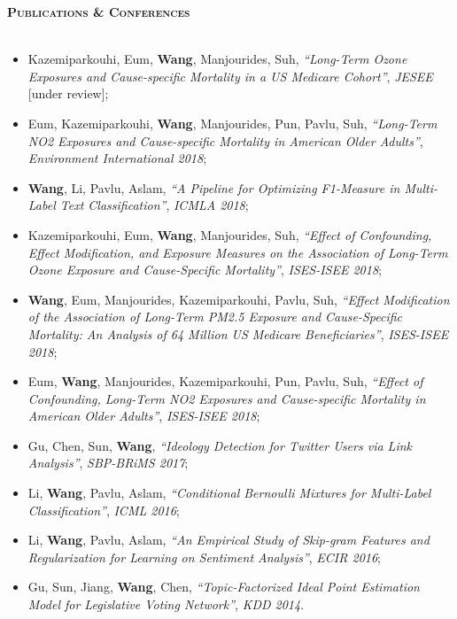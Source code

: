 \documentclass[11pt]{article}
\makeatletter
\newcommand{\lineunder}{\vspace*{-8pt} \\ \hspace*{-18pt} \hrulefill \\}
\newcommand{\header}[1]{{\hspace*{-15pt}\vspace*{6pt} \large \textsc{\textbf{#1}}} \vspace*{-6pt} \lineunder}
\newcommand{\headerrow}[2]
{\begin{tabular*}{\linewidth}{l@{\extracolsep{\fill}}r}
	\hspace*{-15pt}#1 & #2 \\
\end{tabular*}}
\makeatother
\begin{document}
\newpage

\header{Publications \& Conferences}
\begin{itemize}
\item Kazemiparkouhi, Eum, \textbf{Wang}, Manjourides, Suh, \textit{``Long-Term Ozone Exposures and Cause-specific Mortality in a US Medicare Cohort''}, {\emph{JESEE}} [under review];

\item Eum, Kazemiparkouhi, \textbf{Wang}, Manjourides, Pun, Pavlu, Suh, \textit{``Long-Term NO2 Exposures and Cause-specific Mortality in American Older Adults''}, {\emph{Environment International 2018}};

\item  \textbf{Wang}, Li, Pavlu, Aslam, \textit{``A Pipeline for Optimizing F1-Measure in Multi-Label Text Classification''}, {\emph{ICMLA 2018}};

\item Kazemiparkouhi, Eum, \textbf{Wang}, Manjourides, Suh, \textit{``Effect of Confounding, Effect Modification, and Exposure Measures on the Association of Long-Term Ozone Exposure and Cause-Specific Mortality''}, {\emph{ISES-ISEE 2018}};

\item  \textbf{Wang}, Eum, Manjourides, Kazemiparkouhi, Pavlu, Suh, \textit{``Effect Modification of the Association of Long-Term PM2.5 Exposure and Cause-Specific Mortality: An Analysis of 64 Million US Medicare Beneficiaries''}, {\emph{ISES-ISEE 2018}};

\item Eum, \textbf{Wang}, Manjourides, Kazemiparkouhi, Pun, Pavlu, Suh, \textit{``Effect of Confounding, Long-Term NO2 Exposures and Cause-specific Mortality in American Older Adults''}, {\emph{ISES-ISEE 2018}};

\item  Gu, Chen, Sun, \textbf{Wang}, \textit{``Ideology Detection for Twitter Users via Link Analysis''}, {\emph{SBP-BRiMS 2017}};

\item Li, \textbf{Wang}, Pavlu, Aslam, \textit{``Conditional Bernoulli Mixtures for Multi-Label Classification''}, {\emph{ICML 2016}};

\item Li, \textbf{Wang}, Pavlu, Aslam, \textit{``An Empirical Study of Skip-gram Features and Regularization for Learning on Sentiment Analysis''}, {\emph{ECIR 2016}};

\item Gu, Sun, Jiang, \textbf{Wang}, Chen, \textit{``Topic-Factorized Ideal Point Estimation Model for Legislative Voting Network''}, {\emph{KDD 2014}}.

\end{itemize}
\end{document}
